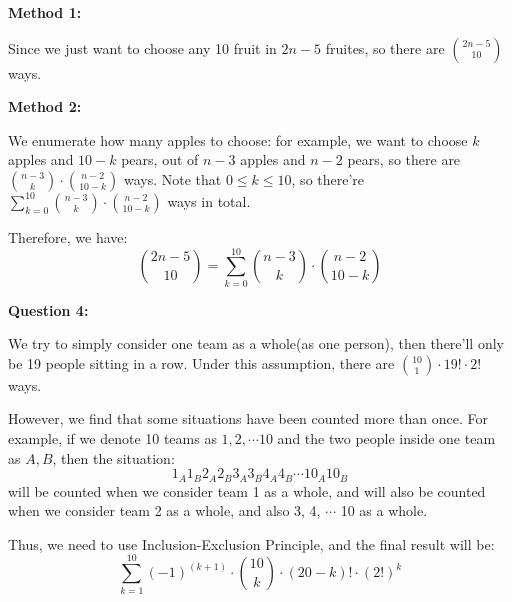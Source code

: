 \documentclass[a4paper,11pt]{article}
\begin{document}
\begin{spacing}{1.4}
    \textbf{Method 1:} 
    
    \hspace{2em}
    Since we just want to choose any 10 fruit in 
    $2n-5$ fruites, so there are ${2n-5\choose 10}$ ways.

    \textbf{Method 2:} 
    
    \hspace{2em}
    We enumerate how many apples to choose: 
    for example, we want to choose $k$ apples and $10-k$ pears, out of
    $n-3$ apples and $n-2$ pears, so there are 
    ${n-3\choose k}\cdot {n-2\choose 10-k}$ ways.
    Note that $0\le k \le 10$, so there're 
    $\sum_{k=0}^{10}{n-3\choose k}\cdot {n-2\choose 10-k}$ ways in total.

    Therefore, we have:
    $${2n-5\choose 10}=\sum_{k=0}^{10}{n-3\choose k}\cdot {n-2\choose 10-k}$$


    \vspace{20pt}

    \textbf{Question 4:}

    \hspace{2em}
    We try to simply consider one team as a whole(as one person), 
    then there'll only be 
    19 people sitting in a row. Under this assumption, there are
    ${10\choose 1}\cdot 19!\cdot 2!$ ways.

    \hspace{2em}
    However, we find that some situations have been counted more than once.
    For example, if we denote 10 teams as $1,2,\cdots 10$ and the two
    people inside one team as $A, B$, then the situation:
    $$1_A 1_B 2_A 2_B 3_A 3_B 4_A 4_B\cdots 10_A 10_B$$
    will be counted when we consider team 1 as a whole, and will also be 
    counted when we consider team 2 as a whole, and also 3, 4, $\cdots$ 10
    as a whole.

    \hspace{2em}
    Thus, we need to use Inclusion-Exclusion Principle, and the final result
    will be:
    $$\sum_{k=1}^{10}(-1)^{(k+1)}\cdot {10\choose k}\cdot (20-k)!\cdot (2!)^k$$
    

    

    
    \end{spacing}
\end{document}
